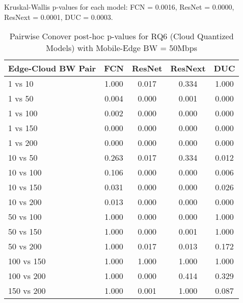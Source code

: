 \begin{table}[h]
\centering
\caption{Pairwise Conover post-hoc p-values for RQ6 (Cloud Quantized Models) with Mobile-Edge BW = 50Mbps}
\label{tab:conover_cloud_quantized_me50}
\smallskip
Kruskal-Wallis p-values for each model: FCN = 0.0016, ResNet = 0.0000, ResNext = 0.0001, DUC = 0.0003.

\begin{tabular}{lcccc}
\toprule
Edge-Cloud BW Pair & FCN & ResNet & ResNext & DUC \\
\midrule
1 vs 10 & 1.000 & 0.017 & 0.334 & 1.000 \\
1 vs 50 & 0.004 & 0.000 & 0.001 & 0.000 \\
1 vs 100 & 0.002 & 0.000 & 0.000 & 0.000 \\
1 vs 150 & 0.000 & 0.000 & 0.000 & 0.000 \\
1 vs 200 & 0.000 & 0.000 & 0.000 & 0.000 \\
10 vs 50 & 0.263 & 0.017 & 0.334 & 0.012 \\
10 vs 100 & 0.106 & 0.000 & 0.000 & 0.006 \\
10 vs 150 & 0.031 & 0.000 & 0.000 & 0.026 \\
10 vs 200 & 0.013 & 0.000 & 0.000 & 0.000 \\
50 vs 100 & 1.000 & 0.000 & 0.000 & 1.000 \\
50 vs 150 & 1.000 & 0.000 & 0.001 & 1.000 \\
50 vs 200 & 1.000 & 0.017 & 0.013 & 0.172 \\
100 vs 150 & 1.000 & 1.000 & 1.000 & 1.000 \\
100 vs 200 & 1.000 & 0.000 & 0.414 & 0.329 \\
150 vs 200 & 1.000 & 0.001 & 1.000 & 0.087 \\
\bottomrule
\end{tabular}
\end{table}

